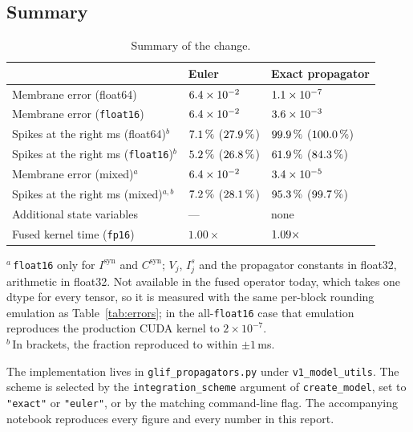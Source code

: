 \documentclass[11pt,a4paper,numbers=noenddot]{scrartcl}
\newcommand{\Isyn}{I^{\mathrm{syn}}}
\newcommand{\Csyn}{C^{\mathrm{syn}}}
\newcommand{\code}[1]{\texttt{\small #1}}
\newlength{\fullwidth}
\newenvironment{widetable}%
  {\begin{lrbox}{\widetablebox}\begin{minipage}{\fullwidth}\small\centering}%
  {\end{minipage}\end{lrbox}%
   \noindent\makebox[\textwidth][l]{\usebox{\widetablebox}}}
\begin{document}
\subsection{Summary}

\begin{table}[h]
  \caption[Summary]{Summary of the change.}
  \label{tab:summary}
  \begin{widetable}
  \begin{tabular}{lll}
    \toprule
     & Euler & Exact propagator \\
    \midrule
    Membrane error (float64)        & $6.4\times 10^{-2}$      & $1.1\times 10^{-7}$ \\
    Membrane error (\code{float16}) & $6.4\times 10^{-2}$  & $3.6\times 10^{-3}$ \\
    Spikes at the right ms (float64)$^{b}$ & $7.1\,\%$ ($27.9\,\%$) & $99.9\,\%$ ($100.0\,\%$) \\
    Spikes at the right ms (\code{float16})$^{b}$ & $5.2\,\%$ ($26.8\,\%$) & $61.9\,\%$ ($84.3\,\%$) \\
    Membrane error (mixed)$^{a}$    & $6.4\times 10^{-2}$ & $3.4\times 10^{-5}$ \\
    Spikes at the right ms (mixed)$^{a,b}$ & $7.2\,\%$ ($28.1\,\%$) & $95.3\,\%$ ($99.7\,\%$) \\
    Additional state variables      & ---                & none \\
    Fused kernel time (\code{fp16}) & $1.00\times$       & $1.09\times$ \\
    \bottomrule
  \end{tabular}
  \par\smallskip\footnotesize
  $^{a}$\,\code{float16} only for $\Isyn$ and $\Csyn$; $V_j$, $I^{s}_j$ and the
  propagator constants in float32, arithmetic in float32. Not available in the
  fused operator today, which takes one dtype for every tensor, so it is
  measured with the same per-block rounding emulation as Table~\ref{tab:errors};
  in the all-\code{float16} case that emulation reproduces the production CUDA
  kernel to $2\times10^{-7}$.\\
  $^{b}$\,In brackets, the fraction reproduced to within $\pm 1\,$ms.
  \end{widetable}
\end{table}

\vspace{1em}
\noindent
\begin{sloppypar}
The implementation lives in \code{glif\_propagators.py} under
\code{v1\_model\_utils}. The scheme is selected by the
\code{integration\_scheme} argument of \code{create\_model}, set to
\code{"exact"} or \code{"euler"}, or by the matching command-line flag. The
accompanying notebook reproduces every figure and every number in this report.
\end{sloppypar}

\printbibliography[heading=bibnumbered,title={References}]
\end{document}
